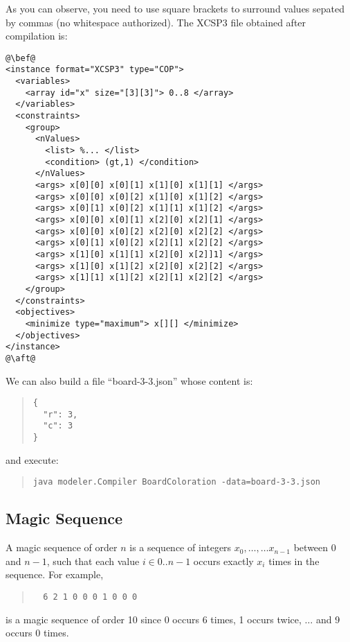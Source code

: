 \documentclass[10pt]{article}
\def\xt{{\rm XCSP3}\xspace}
\def\xt{{\rm XCSP3}\xspace}
\begin{document}
As you can observe, you need to use square brackets to surround values sepated by commas (no whitespace authorized).
The \xt file obtained after compilation is:

\begin{lstlisting}
@\bef@
<instance format="XCSP3" type="COP">
  <variables>
    <array id="x" size="[3][3]"> 0..8 </array>
  </variables>
  <constraints>
    <group>
      <nValues>
        <list> %... </list>
        <condition> (gt,1) </condition>
      </nValues>
      <args> x[0][0] x[0][1] x[1][0] x[1][1] </args>
      <args> x[0][0] x[0][2] x[1][0] x[1][2] </args>
      <args> x[0][1] x[0][2] x[1][1] x[1][2] </args>
      <args> x[0][0] x[0][1] x[2][0] x[2][1] </args>
      <args> x[0][0] x[0][2] x[2][0] x[2][2] </args>
      <args> x[0][1] x[0][2] x[2][1] x[2][2] </args>
      <args> x[1][0] x[1][1] x[2][0] x[2]]1] </args>
      <args> x[1][0] x[1][2] x[2][0] x[2][2] </args>
      <args> x[1][1] x[1][2] x[2][1] x[2][2] </args>
    </group>
  </constraints>
  <objectives>
    <minimize type="maximum"> x[][] </minimize>
  </objectives>
</instance>
@\aft@
\end{lstlisting}

We can also build a file ``board-3-3.json'' whose content is:
\begin{quote}
\begin{verbatim}
{
  "r": 3,
  "c": 3
}
\end{verbatim}
\end{quote}
and execute:
\begin{quote}
\begin{verbatim}
java modeler.Compiler BoardColoration -data=board-3-3.json
\end{verbatim}
\end{quote}


\subsection{Magic Sequence}

A magic sequence of order $n$ is a sequence of integers $x_0,\dots,…x_{n-1}$ between 0 and $n-1$, such that each value $i \in 0..n−1$ occurs exactly $x_i$ times in the sequence.
For example,
\begin{quote}
\begin{verbatim}
  6 2 1 0 0 0 1 0 0 0
\end{verbatim}
\end{quote}
is a magic sequence of order 10 since 0 occurs 6 times, 1 occurs twice, $\dots$ and 9 occurs 0 times.
\end{document}
